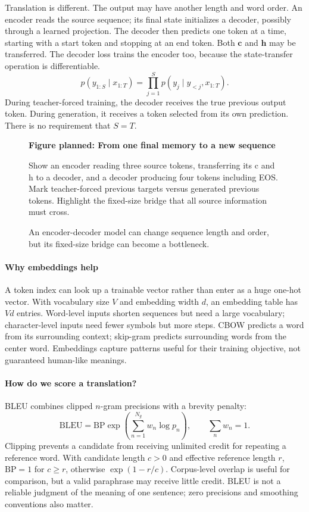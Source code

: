 \documentclass[11pt, oneside]{book}
\newcommand{\figureplaceholder}[5]{%
\begin{figure}[htbp]
\centering
\begin{tcolorbox}[unbreakable,width=\linewidth,height=#1,colback=accent!3,
  colframe=accent!30,boxrule=0.5pt,arc=2.5mm,sharp corners=all,
  valign=center,halign=center,fontupper=\small]
{\bfseries\color{accent}Figure planned: #2}\par\medskip
{\color{gray!75!black}#3}
\end{tcolorbox}
\caption{#4}\label{#5}
\end{figure}}
\begin{document}
Translation is different. The output may have another length and word order. An encoder reads the source sequence; its final state initializes a decoder, possibly through a learned projection. The decoder then predicts one token at a time, starting with a start token and stopping at an end token. Both $\mathbf{c}$ and $\mathbf{h}$ may be transferred. The decoder loss trains the encoder too, because the state-transfer operation is differentiable.
\[
 p(y_{1:S}\mid x_{1:T})=\prod_{j=1}^{S}p(y_j\mid y_{<j},x_{1:T}).
\]
During teacher-forced training, the decoder receives the true previous output token. During generation, it receives a token selected from its own prediction. There is no requirement that $S=T$.

\figureplaceholder{3.5cm}{From one final memory to a new sequence}{Show an encoder reading three source tokens, transferring its c and h to a decoder, and a decoder producing four tokens including EOS. Mark teacher-forced previous targets versus generated previous tokens. Highlight the fixed-size bridge that all source information must cross.}{An encoder-decoder model can change sequence length and order, but its fixed-size bridge can become a bottleneck.}{fig:seq2seq-bridge}

\paragraph{Why embeddings help} A token index can look up a trainable vector rather than enter as a huge one-hot vector. With vocabulary size $V$ and embedding width $d$, an embedding table has $Vd$ entries. Word-level inputs shorten sequences but need a large vocabulary; character-level inputs need fewer symbols but more steps. CBOW predicts a word from its surrounding context; skip-gram predicts surrounding words from the center word. Embeddings capture patterns useful for their training objective, not guaranteed human-like meanings.

\paragraph{How do we score a translation?} BLEU combines clipped $n$-gram precisions with a brevity penalty:
\[
 \mathrm{BLEU}=\mathrm{BP}\exp\!\left(\sum_{n=1}^{N_g}w_n\log p_n\right),
 \qquad \sum_n w_n=1.
\]
Clipping prevents a candidate from receiving unlimited credit for repeating a reference word. With candidate length $c>0$ and effective reference length $r$, $\mathrm{BP}=1$ for $c\geq r$, otherwise $\exp(1-r/c)$. Corpus-level overlap is useful for comparison, but a valid paraphrase may receive little credit. BLEU is not a reliable judgment of the meaning of one sentence; zero precisions and smoothing conventions also matter.
\end{document}
